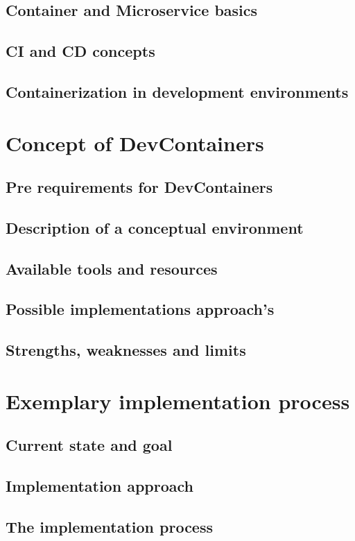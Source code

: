 \documentclass[12pt, a4paper]{article}
\begin{document}
    \subsection{ Container and Microservice basics}
    \subsection{ \acl{CI} and \acl{CD} concepts}
    \subsection{ Containerization in development environments}
\section{ Concept of DevContainers}
    \subsection{ Pre requirements for DevContainers}
    \subsection{ Description of a conceptual environment}
    \subsection{ Available tools and resources}
    \subsection{ Possible implementations approach's}
    \subsection{ Strengths, weaknesses and limits}
\section{ Exemplary implementation process}
    \subsection{ Current state and goal}
    \subsection{ Implementation approach}
    \subsection{ The implementation process}
\end{document}
